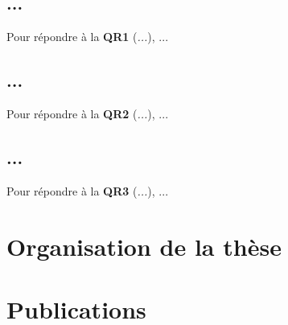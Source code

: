 \subsection{...}

Pour répondre à la \textbf{QR1} (\textit{...}), ...

\subsection{...}

Pour répondre à la \textbf{QR2} (\textit{...}), ...

\subsection{...}

Pour répondre à la \textbf{QR3} (\textit{...}), ...

\section{Organisation de la thèse}

\section{Publications}

